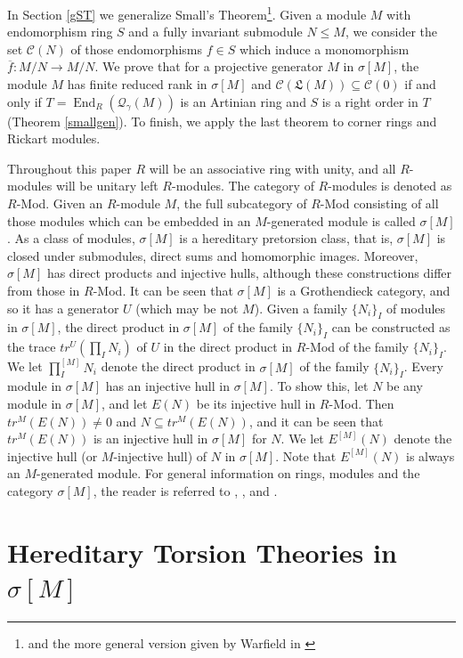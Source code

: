 \documentclass{amsart}
\theoremstyle{definition}
\theoremstyle{remark}
\numberwithin{equation}{section}
\DeclareMathOperator{\End}{End}
\newcommand{\sm}{\sigma[M]}
\begin{document}
	In Section \ref{gST} we generalize Small's Theorem\footnote{and the more general version given by Warfield in \cite{warfield1979bezout}}.
	Given a module $M$ with endomorphism ring $S$ 
	and a fully invariant submodule $N\leq M$, 
	we consider the set $\mathcal{C}(N)$ 
	of those endomorphisms $f\in S$ 
	which induce a monomorphism $\overline{f}:M/N\to M/N$. 
	We prove that for a projective generator $M$ in $\sm$, 
	the module $M$ has finite reduced rank in $\sm$ 
	and $\mathcal{C}(\mathfrak{L}(M))\subseteq\mathcal{C}(0)$ 
	if and only if 
	$T=\End_R(\mathcal{Q}_{\gamma}(M))$ is an Artinian ring 
	and $S$ is a right order in $T$ (Theorem \ref{smallgen}). To finish, we apply the last theorem to corner rings and Rickart modules.
	
	Throughout this paper $R$ will be an associative ring with unity, 
	and all $R$-modules will be unitary left $R$-modules. 
	The category of $R$-modules is denoted as $R$-Mod. 
	Given an $R$-module $M$, 
	the full subcategory of $R$-Mod 
	consisting of all those modules 
	which can be embedded in an $M$-generated module is called $\sm$. 
	As a class of modules, 
	$\sm$ is a hereditary pretorsion class, 
	that is, $\sm$ is closed under submodules, 
	direct sums and homomorphic images. 
	Moreover, $\sm$ has direct products and injective hulls, 
	although these constructions differ from those in $R$-Mod. 
	It can be seen that $\sm$ is a Grothendieck category,
	and so it has  a generator $U$ 
	(which may be not $M$). 
	Given a family $\{N_i\}_I$ of modules in $\sm$, 
	the direct product in $\sm$ of the family $\{N_i\}_I$ 
	can be constructed as the trace $tr^{U}(\prod_IN_i)$ 
	of $U$ in the direct product in $R$-Mod of the family $\{N_i\}_I$. 
	We let $\prod_I^{[M]}N_i$ denote the direct product in $\sm$ 
	of the family $\{N_i\}_I$. 
	Every module in $\sm$ has an injective hull in $\sm$. 
	To show this, 
	let $N$ be any module in $\sm$, 
	and let $E(N)$ be its injective hull in $R$-Mod. 
	Then $tr^M(E(N))\neq 0$ and $N\subseteq tr^M(E(N))$, 
	and it can be seen that $tr^M(E(N))$ is an injective hull in $\sm$ for $N$. 
	We let $E^{[M]}(N)$ denote the injective hull 
	(or $M$-injective hull) of $N$ in $\sm$. 
	Note that $E^{[M]}(N)$ is always an $M$-generated module. 
	For general information on rings, modules and the category $\sm$, 
	the reader is referred to 
	\cite{lamlectures}, \cite{stenstromrings}, and \cite{wisbauerfoundations}.
	
	\section{Hereditary Torsion Theories in $\sigma [M]$}
	\label{httsm}
	
\end{document}
